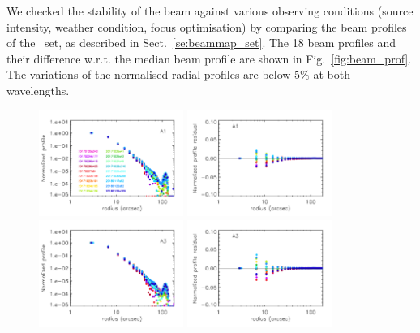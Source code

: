 We checked the stability of the beam against various observing
conditions (source intensity, weather condition, focus optimisation) by
comparing the beam profiles of the \bm\ set, as described in
Sect.~\ref{se:beammap_set}. The 18 beam profiles and their difference
w.r.t. the median beam profile are shown in Fig.~\ref{fig:beam_prof}.
The variations of the normalised radial profiles are below $5\%$ at
both wavelengths. 


\begin{figure}[ht!]
  \centering
   \includegraphics[clip, width=0.42\textwidth]{Figures/Beams/plot_profiles_a1.pdf}
   \includegraphics[clip, width=0.42\textwidth]{Figures/Beams/plot_profile_diff_wrt_median_a1.pdf}
   \includegraphics[clip, width=0.42\textwidth]{Figures/Beams/plot_profiles_a3.pdf}
   \includegraphics[clip, width=0.42\textwidth]{Figures/Beams/plot_profile_diff_wrt_median_a3.pdf}

\end{figure}
